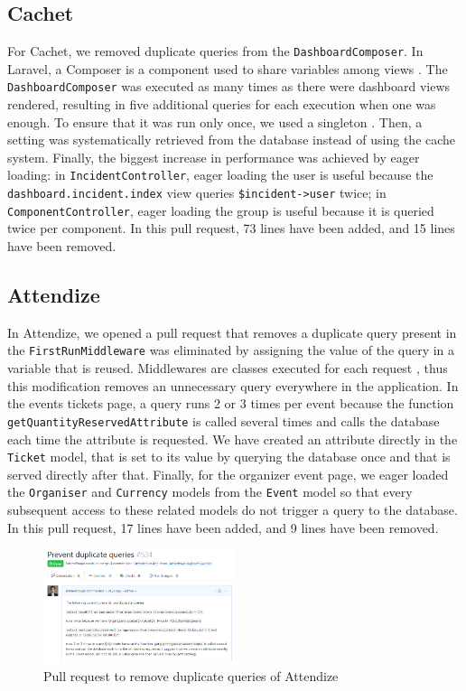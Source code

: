 \documentclass[sigconf]{acmart}
\begin{document}
\subsection{Cachet}
For Cachet, we removed duplicate queries from the \texttt{Dashboard\-Composer}. In Laravel, a Composer is a component used to share variables among views \cite{viewcomposer}. The \texttt{DashboardComposer} was executed as many times as there were dashboard views rendered, resulting in five additional queries for each execution when one was enough. To ensure that it was run only once, we used a singleton \cite{singleton}. Then, a setting was systematically retrieved from the database instead of using the cache system. Finally, the biggest increase in performance was achieved by eager loading: in \texttt{IncidentController}, eager loading the user is useful because the \texttt{dashboard.incident.index} view queries \texttt{\$incident->user} twice; in \texttt{ComponentController}, eager loading the group is useful because it is queried twice per component. In this pull request, 73 lines have been added, and 15 lines have been removed.
\subsection{Attendize}
In Attendize, we opened a pull request \cite{prattendize} that removes a duplicate query present in the \texttt{FirstRunMiddleware} was eliminated by assigning the value of the query in a variable that is reused. Middlewares are classes executed for each request \cite{middleware}, thus this modification removes an unnecessary query everywhere in the application. In the events tickets page, a query runs 2 or 3 times per event because the function \texttt{getQuantityReservedAttribute} is called several times and calls the database each time the attribute is requested. We have created an attribute directly in the \texttt{Ticket} model, that is set to its value by querying the database once and that is served directly after that. Finally, for the organizer event page, we eager loaded the \texttt{Organiser} and \texttt{Currency} models from the \texttt{Event} model so that every subsequent access to these related models do not trigger a query to the database. In this pull request, 17 lines have been added, and 9 lines have been removed.
\begin{figure}[t!]
\includegraphics[width=0.5\textwidth]{prattendize}
\caption{Pull request to remove duplicate queries of Attendize}
\label{prattendize}
\end{figure}
\end{document}
